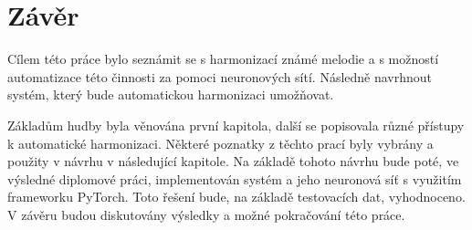 \chapter{Závěr}
\label{zaver}
Cílem této práce bylo seznámit se s harmonizací známé melodie a s možností automatizace této činnosti za pomoci neuronových sítí.
Následně navrhnout systém, který bude automatickou harmonizaci umožňovat.
\par
Základům hudby byla věnována první kapitola, 
další se popisovala různé přístupy k automatické harmonizaci. Některé poznatky z těchto prací byly vybrány a použity v návrhu v následující kapitole.
Na základě tohoto návrhu bude poté, ve výsledné diplomové práci, implementován systém a jeho neuronová síť s využitím frameworku PyTorch.
Toto řešení bude, na základě testovacích dat, vyhodnoceno.
V závěru budou diskutovány výsledky a možné pokračování této práce.
